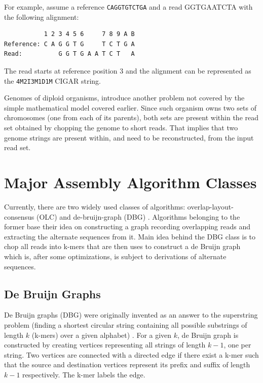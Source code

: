 For example, assume a reference \texttt{CAGGTGTCTGA} and a read GGTGAATCTA with the following alignment:
\begin{verbatim}
           1 2 3 4 5 6     7 8 9 A B
Reference: C A G G T G     T C T G A
Read:          G G T G A A T C T   A
\end{verbatim}
The read starts at reference position 3 and the alignment can be represented as the \texttt{4M2I3M1D1M} CIGAR string.

Genomes of diploid organisms, introduce another problem not covered by the simple mathematical model covered earlier. Since such organism owns two sets of chromosomes (one from each of its parents), both sets are present within the read set obtained by chopping the genome to short reads. That implies that two genome strings are present within, and need to be reconstructed, from the input read set.

\section{Major Assembly Algorithm Classes}
\label{sec:major-assembly-algorithm-classes}

Currently, there are two widely used classes of algorithms: overlap-layout-consensus (OLC) and de-bruijn-graph (DBG) \cite{alg-compare}. Algorithms belonging to the former base their idea on constructing a graph recording overlapping reads and extracting the alternate sequences from it. Main idea behind the DBG class is to chop all reads into k-mers that are then uses to construct a de Bruijn graph which is, after some optimizations, is subject to derivations of alternate sequences.

\subsection{De Bruijn Graphs}
\label{subsec:de-bruijn-graphs}

De Bruijn graphs (DBG) were originally invented as an answer to the superstring problem  (finding a shortest circular string containing all possible substrings of length $k$ (k-mers) over a given alphabet) \cite{dbg-apply}. For a given $k$, de Bruijn graph is constructed by creating vertices representing all strings of length $k-1$, one per string. Two vertices are connected with a directed edge if there exist a k-mer such that the source and destination vertices represent its prefix and suffix of length $k-1$ respectively. The k-mer labels the edge. 

